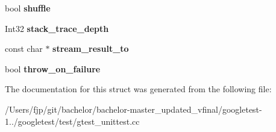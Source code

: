 \begin{DoxyCompactItemize}
\mbox{\label{structtesting_1_1_flags_a51c689e47e0f55c16116ac2a1d3b05d6}} 
bool {\bfseries shuffle}
\item 
\mbox{\label{structtesting_1_1_flags_a20c6592453909c1adace64bf6a2bc2de}} 
Int32 {\bfseries stack\+\_\+trace\+\_\+depth}
\item 
\mbox{\label{structtesting_1_1_flags_ab09849fd3e095d5628dec65ec4dce9e1}} 
const char $\ast$ {\bfseries stream\+\_\+result\+\_\+to}
\item 
\mbox{\label{structtesting_1_1_flags_ab8e7d21e31e641efe47b8050759e001a}} 
bool {\bfseries throw\+\_\+on\+\_\+failure}
\end{DoxyCompactItemize}


The documentation for this struct was generated from the following file\+:\begin{DoxyCompactItemize}
\item 
/\+Users/fjp/git/bachelor/bachelor-\/master\+\_\+updated\+\_\+vfinal/googletest-\/1../googletest/test/gtest\+\_\+unittest.\+cc\end{DoxyCompactItemize}
